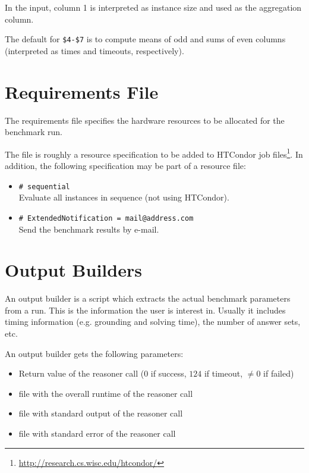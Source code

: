 \documentclass[a4paper]{article}
\begin{document}
			In the input, column 1 is interpreted as instance size and used as the aggregation column.
		
			The default for {\tt \$4-\$7}
			is to compute means of odd and sums of even columns (interpreted as times and timeouts, respectively).
			
	\section{Requirements File}
	\label{sec:reqfile}
			
		The requirements file specifies the hardware resources to be allocated
		for the benchmark run.
		
		The file is roughly a resource specification to be added to
		HTCondor job files\footnote{\url{http://research.cs.wisc.edu/htcondor/}}.
		In addition, the following specification may be part of a resource file:
		\begin{itemize}
		\item {\tt \# sequential} \\
			Evaluate all instances in sequence (not using HTCondor).
		\item {\tt \# ExtendedNotification = mail@address.com} \\
			 Send the benchmark results by e-mail. 
		\end{itemize}

	
	\section{Output Builders}
	\label{sec:outputbuilder}
			
		An output builder is a script which extracts the actual benchmark parameters
		from a run. This is the information the user is interest in. Usually it
		includes timing information (e.g. grounding and solving time), the number of answer sets, etc.
		
		An output builder gets the following parameters:
		    \begin{itemize}
				\item[{\tt \$1}:] Return value of the reasoner call ($0$ if success, $124$ if timeout, $\not= 0$ if failed)
				\item[{\tt \$2}:] file with the overall runtime of the reasoner call
				\item[{\tt \$3}:] file with standard output of the reasoner call
				\item[{\tt \$4}:] file with standard error of the reasoner call
		    \end{itemize}
		
\end{document}

